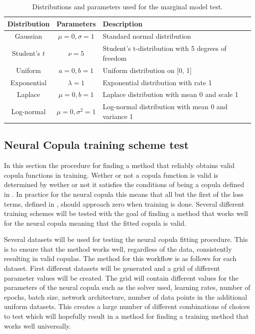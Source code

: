 \begin{table}[h]
    \centering
    \caption{Distributions and parameters used for the marginal model test.}
    \begin{tabular}{@{}ccl@{}}
        Distribution & Parameters & Description \\
        \toprule
        Gaussian & $\mu=0, \sigma=1$ & Standard normal distribution \\ 
        Student's $t$ & $\nu=5$ & Student's t-distribution with 5 degrees of freedom \\ 
        Uniform & $a=0, b=1$ & Uniform distribution on [0, 1] \\ 
        Exponential & $\lambda=1$ & Exponential distribution with rate 1 \\ 
        Laplace & $\mu=0, b=1$ & Laplace distribution with mean 0 and scale 1 \\ 
        Log-normal & $\mu=0, \sigma^2=1$ & Log-normal distribution with mean 0 and variance 1 \\ 
    \end{tabular}
    \label{tab:distributions}
\end{table}



\subsection{Neural Copula training scheme test}
In this section the procedure for finding a method that reliably obtains valid copula functions in training. Wether or not a copula function is valid is determined by wether or not it satisfies the conditions of being a copula defined in . In practice for the neural copula this means that all but the first of the loss terms, defined in , should approach zero when training is done. Several different training schemes will be tested with the goal of finding a method that works well for the neural copula meaning that the fitted copula is valid.

Several datasets will be used for testing the neural copula fitting procedure. This is to ensure that the method works well, regardless of the data, consistently resulting in valid copulas. The method for this workflow is as follows for each dataset. First different datasets will be generated  and a grid of different parameter values will be created. The grid will contain different values for the parameters of the neural copula such as the solver used, learning rates, number of epochs, batch size, network architecture, number of data points in the additional uniform datasets. This creates a large number of different combinations of choices to test which will hopefully result in a method for finding a training method that works well universally.  

